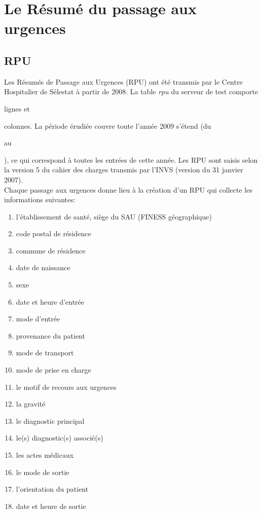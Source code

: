\documentclass[12pt,english,french,twoside]{report}\usepackage[]{graphicx}\usepackage[]{color}
\begin{document}
  
\chapter{Le Résumé du passage aux urgences}


\section*{RPU}

Les Résumés de Passage aux Urgences (RPU) ont été transmis par le Centre Hospitalier de Sélestat à partir de 2008. 
La table \emph{rpu} du serveur de test comporte 

{\ttfamily\noindent\bfseries\color{errorcolor}{\\Error in nrow(d2) : objet 'd2' introuvable}} lignes et 

{\ttfamily\noindent\bfseries\color{errorcolor}{\\Error in ncol(d2) : objet 'd2' introuvable}} colonnes. La période érudiée couvre toute l'année 2009 s'étend (du 

{\ttfamily\noindent\bfseries\color{errorcolor}{\\Error in eval(expr, envir, enclos) : objet 'd2' introuvable}} au 

{\ttfamily\noindent\bfseries\color{errorcolor}{\\Error in eval(expr, envir, enclos) : objet 'd2' introuvable}}), ce qui correspond à toutes les entrées de cette année. Les RPU sont saisis selon la version 5 du cahier des charges transmis par l'INVS (version du 31 janvier 2007).
\\
Chaque passage aux urgences donne lieu à la création d'un RPU qui collecte les informations suivantes:
\begin{enumerate}
  \item l'établissement de santé, siège du SAU (FINESS géographique)
  \item code postal de résidence
  \item commune de résidence
  \item date de naissance
  \item sexe
  \item date et heure d'entrée
  \item mode d'entrée
  \item provenance du patient
  \item mode de transport
  \item mode de prise en charge
  \item le motif de recours aux urgences
  \item la gravité
  \item le diagnostic principal
  \item le(s) diagnostic(s) associé(s)
  \item les actes médicaux
  \item le mode de sortie
  \item l'orientation du patient
  \item date et heure de sortie
\end{enumerate}
\end{document}
